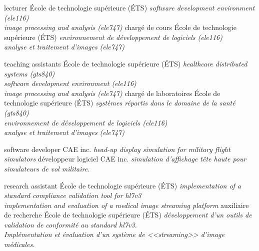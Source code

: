\documentclass[print]{friggeri-cv}
\begin{document}

\begin{entrylist}
  \engfr
  { {lecturer} {École de technologie supérieure {\scriptsize (ÉTS)}} {\emph{software development environment (ele{\footnotesize116})\\image processing and analysis (ele{\footnotesize747})}}}
  { {chargé de cours} {École de technologie supérieure {\scriptsize (ÉTS)}} {\emph{environnement de développement de logiciels (ele{\footnotesize116})\\analyse et traitement d'images (ele{\footnotesize747})}}}

  \engfr
  { {teaching assistants} {École de technologie supérieure {\scriptsize (ÉTS)}} {\emph{healthcare distributed systems (gts{\footnotesize840})\\software development environment (ele{\footnotesize116})\\image processing and analysis (ele{\footnotesize747})}}}
  { {chargé de laboratoires} {École de technologie supérieure {\scriptsize (ÉTS)}} {\emph{systèmes répartis dans le domaine de la santé (gts{\footnotesize840})\\environnement de développement de logiciels (ele{\footnotesize116})\\analyse et traitement d'images (ele{\footnotesize747})}}}

  \engfr
  { {software developer} {\scriptsize{CAE} inc.} {\emph{head-up display simulation for military flight simulators}}}
  { {développeur logiciel} {\scriptsize{CAE} inc.} {\emph{simulation d'affichage tête haute pour simulateurs de vol militaire.}}}

  \engfr
  { {research assistant} {École de technologie supérieure {\scriptsize (ÉTS)}} {\emph{implementation of a standard compliance validation tool for hl{\small7}v{\small3}\\implementation and evaluation of a medical image streaming platform}}}
  { {auxiliaire de recherche} {École de technologie supérieure {\scriptsize (ÉTS)}} {\emph{développement d'un outils de validation de conformité au standard hl{\small7}v{\small3}.\\Implémentation et évaluation d'un système de <<streaming>> d'image médicales.}}}
\end{entrylist}
\end{document}
